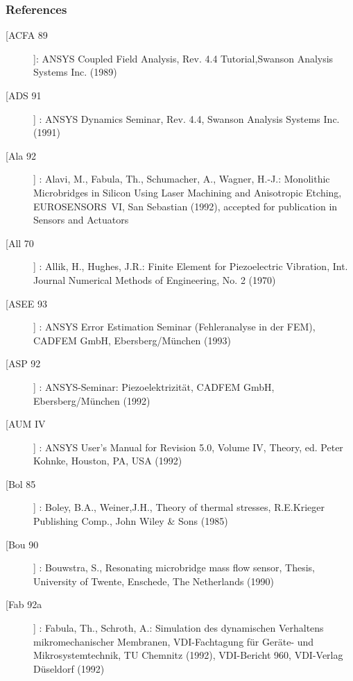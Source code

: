 \subsubsection{References}

\vspace*{0.5cm}

\begin{description}

\item[[ACFA 89]]: ANSYS Coupled Field Analysis, Rev. 4.4 Tutorial,Swanson Analysis Systems Inc. (1989)
\\
\item[[ADS 91]] : ANSYS Dynamics Seminar, Rev. 4.4, Swanson Analysis Systems Inc. (1991)
\\
\item[[Ala 92]] : Alavi, M., Fabula, Th., Schumacher, A., Wagner, H.-J.: Monolithic Microbridges in Silicon Using Laser Machining and Anisotropic Etching, \mbox{EUROSENSORS VI}, San Sebastian (1992), accepted for publication in Sensors and Actuators
\\
\item[[All 70]] : Allik, H., Hughes, J.R.: Finite Element for Piezoelectric Vibration, Int. Journal Numerical Methods of Engineering, No. 2 (1970)
 \\
\item[[ASEE 93]] : ANSYS Error Estimation Seminar (Fehleranalyse in der FEM), CADFEM GmbH, Ebersberg/München (1993)
\\
\item[[ASP 92]] : ANSYS-Seminar: Piezoelektrizität, CADFEM GmbH, Ebersberg/München (1992)
\\
\item[[AUM IV]] : ANSYS User's Manual for Revision 5.0, Volume IV, Theory, ed. Peter Kohnke, Houston, PA, USA (1992)
\\
\item[[Bol 85]] : Boley, B.A., Weiner,J.H., Theory of thermal stresses, R.E.Krieger Publishing Comp., John Wiley \& Sons (1985)
\\
\item[[Bou 90]] : Bouwstra, S., Resonating microbridge mass flow sensor, Thesis, University of Twente, Enschede, The Netherlands (1990)
\\
\item[[Fab 92a]] : Fabula, Th., Schroth, A.: Simulation des dynamischen Verhaltens mikromechanischer Membranen, VDI-Fachtagung für Geräte- und Mikrosystemtechnik, TU Chemnitz (1992), VDI-Bericht 960, VDI-Verlag Düseldorf (1992)

\end{description}
